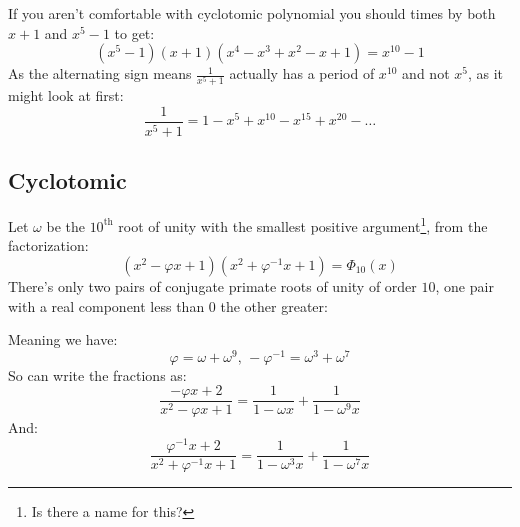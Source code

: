 If you aren't comfortable with cyclotomic polynomial you should times by both $x+1$ and $x^5-1$ to get:
\[(x^5-1)(x+1)(x^4-x^3+x^2-x+1) = x^{10}-1\]
As the alternating sign means $\frac{1}{x^5+1}$ actually has a period of $x^{10}$ and not $x^5$,
as it might look at first:
\[\frac{1}{x^5+1} = 1-x^5+x^{10}-x^{15}+x^{20}-\dots\]

\subsection{Cyclotomic}
Let $\omega$ be the $10^\text{th}$ root of unity with the smallest positive argument\footnote{Is there a name for this?},
from the factorization:
\[(x^2-\varphi x +1)(x^2+\varphi^{-1}x+1)=\Phi_{10}(x)\]
There's only two pairs of conjugate primate roots of unity of order $10$,
one pair with a real component less than $0$ the other greater:
\begin{center}
\end{center}
Meaning we have:
\[ \varphi = \omega+\omega^9,\,-\varphi^{-1} = \omega^3+\omega^7\]
So can write the fractions as:
\[\frac{-\varphi x+2}{x^2-\varphi x + 1} = \frac{1}{1-\omega x}+\frac{1}{1-\omega^9 x}\]
And:
\[\frac{\varphi^{-1} x+2}{x^2+\varphi^{-1} x + 1} = \frac{1}{1-\omega^3 x}+\frac{1}{1-\omega^7 x}\]

